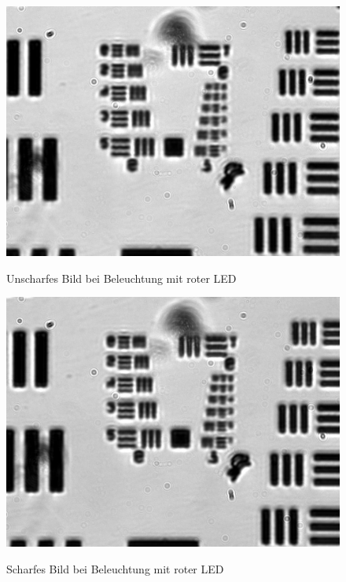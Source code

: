 \documentclass[ngerman]{scrartcl}
\begin{document}
\begin{figure}[H]
    \begin{minipage}[t]{0.475\linewidth}
        \centering
        \includegraphics[width=\linewidth]{fig/Versuch3/hellfeld_3.3_rot_unscharf.jpg}
        \caption[Hellfeld LED rot unscharf]{Unscharfes Bild bei Beleuchtung mit roter LED}
        \label{fig:Hellfeld_3_3_rot_unscharf}
        \includegraphics[width=\linewidth]{fig/Versuch3/hellfeld_3.3_rot_scharf.jpg}
        \caption[Hellfeld LED rot scharf]{Scharfes Bild bei Beleuchtung mit roter LED}
        \label{fig:Hellfeld_3_3_rot_scharf}
    \end{minipage}
\end{figure}
\setcaphanging
\end{document}
